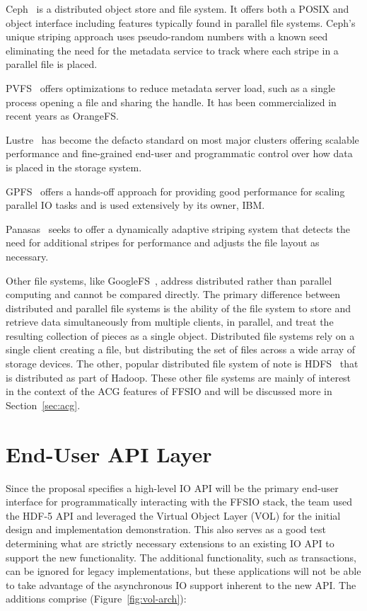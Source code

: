 \documentclass[conference]{IEEEtran}
\begin{document}
Ceph~\cite{weil:ceph} is a distributed object store and file system. It offers
both a POSIX and object interface including features typically found in parallel
file systems. Ceph's unique striping approach uses pseudo-random numbers with a
known seed eliminating the need for the metadata service to track where each
stripe in a parallel file is placed.

PVFS~\cite{carns:pvfs} offers optimizations to reduce metadata server load,
such as a single process opening a file and sharing the handle. It has been
commercialized in recent years as OrangeFS.

Lustre~\cite{braam:lustre-arch} has become the defacto standard on most major
clusters offering scalable performance and fine-grained end-user and
programmatic control over how data is placed in the storage system.

GPFS~\cite{schmuck:gpfs} offers a hands-off approach for providing good
performance for scaling parallel IO tasks and is used extensively by its owner,
IBM.

Panasas~\cite{panasas:architecture} seeks to offer a dynamically adaptive
striping system that detects the need for additional stripes for performance
and adjusts the file layout as necessary.

Other file systems, like GoogleFS~\cite{ghemawat:googlefs}, address distributed
rather than parallel computing and cannot be compared directly. The primary
difference between distributed and parallel file systems is the ability of the
file system to store and retrieve data simultaneously from multiple clients, in
parallel, and treat the resulting collection of pieces as a single object.
Distributed file systems rely on a single client creating a file, but
distributing the set of files across a wide array of storage devices. The
other, popular distributed file system of note is
HDFS~\cite{Shvachko:2010:hdfs} that is distributed as part of Hadoop. These
other file systems are mainly of interest in the context of the ACG features of
FFSIO and will be discussed more in Section~\ref{sec:acg}.

\section{End-User API Layer}
\label{sec:end-user}

Since the proposal specifies a high-level IO API will be the primary end-user
interface for programmatically interacting with the FFSIO stack, the team used
the HDF-5 API and leveraged the Virtual Object Layer (VOL) for the initial
design and implementation demonstration. This also serves as a good test
determining what are strictly necessary extensions to an existing IO API to
support the new functionality.  The additional functionality, such as
transactions, can be ignored for legacy implementations, but these applications
will not be able to take advantage of the asynchronous IO support inherent to
the new API.  The additions comprise (Figure~\ref{fig:vol-arch}):
\end{document}
